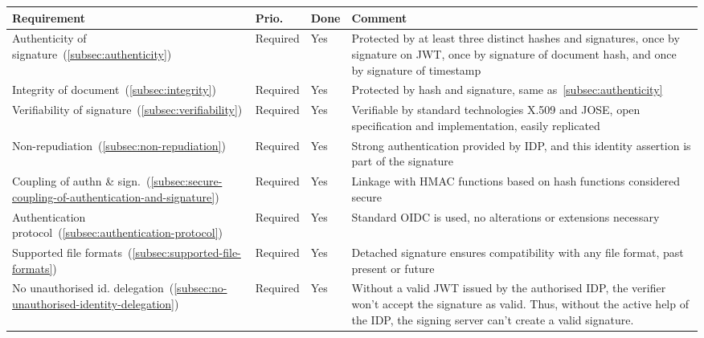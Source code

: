 \begin{center}
    \begin{longtable}{p{4.0cm}|p{1.35cm}|p{0.7cm}|p{9.0cm}}
        \textbf{Requirement} & \textbf{Prio.} & \textbf{Done} & \textbf{Comment}
        \\
        \hline
        Authenticity of signature~(\ref{subsec:authenticity})
        & Required
        & Yes
        & Protected by at least three distinct hashes and signatures,
        once by signature on \gls{JWT},
        once by signature of document hash,
        and once by signature of timestamp
        \\
        \hline
        Integrity of document~(\ref{subsec:integrity})
        & Required
        & Yes
        & Protected by hash and signature, same as~\ref{subsec:authenticity}
        \\
        \hline
        Verifiability of signature~(\ref{subsec:verifiability})
        & Required
        & Yes
        & Verifiable by standard technologies X.509 and \gls{JOSE},
        open specification and implementation,
        easily replicated
        \\
        \hline
        Non-repudiation~(\ref{subsec:non-repudiation})
        & Required
        & Yes
        & Strong authentication provided by \gls{IDP},
        and this identity assertion is part of the signature
        \\
        \hline
        Coupling of authn \& sign.~(\ref{subsec:secure-coupling-of-authentication-and-signature})
        & Required
        & Yes
        & Linkage with \gls{HMAC} functions based on hash functions considered secure
        \\
        \hline
        Authentication protocol~(\ref{subsec:authentication-protocol})
        & Required
        & Yes
        & Standard \gls{OIDC} is used, no alterations or extensions necessary
        \\
        \hline
        Supported file formats~(\ref{subsec:supported-file-formats})
        & Required
        & Yes
        & Detached signature ensures compatibility with any file format, past present or future
        \\ \hline
        No unauthorised id. delegation~(\ref{subsec:no-unauthorised-identity-delegation})
        & Required
        & Yes
        & Without a valid \gls{JWT} issued by the authorised \gls{IDP},
        the verifier won't accept the signature as valid.
        Thus, without the active help of the \gls{IDP},
        the signing server can't create a valid signature.

\end{longtable}
\end{center}
